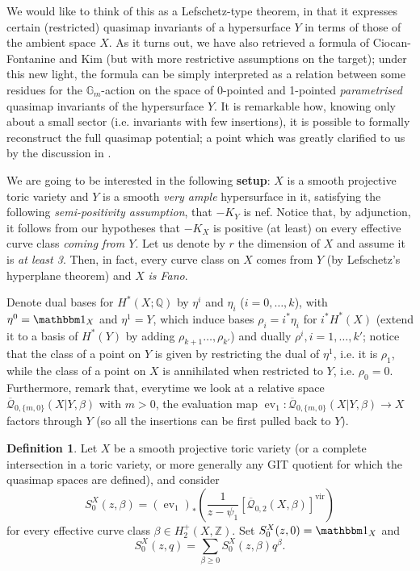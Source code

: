 \documentclass[11pt]{amsart}
\newcommand{\Q}[4]{\overline{\mathcal Q}_{#1,#2}(#3,#4)}
\newcommand{\PP}{\mathbb P}
\renewcommand{\to}{\rightarrow}
\newcommand{\Gm}{\mathbb{G}_m}
\newcommand{\ev}{\operatorname{ev}}
\theoremstyle{plain}
\theoremstyle{definition}
\newtheorem{dfn}[thm]{Definition}
\begin{document}
We would like to think of this as a Lefschetz-type theorem, in that it expresses certain (restricted) quasimap invariants of a hypersurface $Y$ in terms of those of the ambient space $X$. As it turns out, we have also retrieved a formula of Ciocan-Fontanine and Kim \cite[Corollary 5.5.1]{CF-K-wallcrossing} (but with more restrictive assumptions on the target); under this new light, the formula can be simply interpreted as a relation between some residues for the $\Gm$-action on the space of 0-pointed and 1-pointed \emph{parametrised} quasimap invariants of the hypersurface $Y$. It is remarkable how, knowing only about a small sector (i.e. invariants with few insertions), it is possible to formally reconstruct the full quasimap potential; a point which was greatly clarified to us by the discussion in \cite[Section 5.5]{CF-K-wallcrossing}.

We are going to be interested in the following \textbf{setup}: $X$ is a smooth projective toric variety and $Y$ is a smooth \emph{very ample} hypersurface in it, satisfying the following \emph{semi-positivity assumption}, that $-K_Y$ is nef. Notice that, by adjunction, it follows from our hypotheses that $-K_X$ is positive (at least) on every effective curve class \emph{coming from $Y$}. Let us denote by $r$ the dimension of $X$ and assume it is \emph{at least 3}. Then, in fact, every curve class on $X$ comes from $Y$ (by Lefschetz's hyperplane theorem) and $X$ \emph{is Fano}.

Denote dual bases for $H^*(X;\mathbb Q)$ by $\eta^i$ and $\eta_i$ ($i=0,\ldots,k$), with $\eta^0=\mathbbm 1_X$ and $\eta^1=Y$, which induce bases $\rho_i=i^*\eta_i$ for $i^*H^*(X)$ (extend it to a basis of $H^*(Y)$ by adding $\rho_{k+1}\ldots,\rho_{k'}$) and dually $\rho^i, i=1,\ldots,k'$; notice that the class of a point on $Y$ is given by restricting the dual of $\eta^1$, i.e. it is $\rho_1$, while the class of a point on $X$ is annihilated when restricted to $Y$, i.e. $\rho_0=0$. Furthermore, remark that, everytime we look at a relative space $\Q{0}{\{m,0\}}{X|Y}{\beta}$ with $m>0$, the evaluation map $\ev_1\colon \Q{0}{\{m,0\}}{X|Y}{\beta}\to X$ factors through $Y$ (so all the insertions can be first pulled back to $Y$).


\begin{dfn}
 Let $X$ be a smooth projective toric variety (or a complete intersection in a toric variety, or more generally any GIT quotient for which the quasimap spaces are defined), and consider 
 \[
  S_0^X(z,\beta)=(\ev_1)_*\left(\frac{1}{z-\psi_1}[\Q{0}{2}{X}{\beta}]^\text{vir}\right)
 \]
 for every effective curve class $\beta\in H_2^+(X,\mathbb Z)$. Set $S_0^X(z,0)= \mathbbm 1_X$ and
 \[
  S_0^X(z,q)=\sum_{\beta\geq 0}S_0^X(z,\beta) q^\beta.
 \]
\end{dfn}
\end{document}
